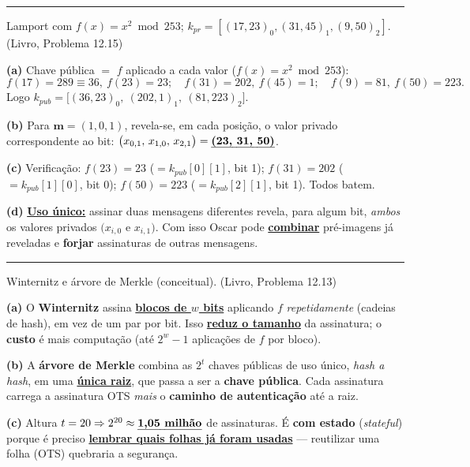 \documentclass[11pt,a4paper]{article}
\newcommand{\livro}[1]{{\footnotesize\color{black!50}(Livro, Problema #1)}}
\newcommand{\alert}[1]{\textbf{\uline{#1}}}
\newcommand{\exercicio}[1]{%
    \Needspace{8\baselineskip}%
    \par\vspace{1.2em}
    \noindent
    {\color{black!55}\rule[-0.25em]{3pt}{1.6em}}%
    \hspace{0.6em}{\Large\bfseries Exerc\'{i}cio #1}
    \par\vspace{-0.4em}
    \noindent{\color{black!35}\rule{\textwidth}{0.4pt}}
    \par\vspace{0.35em}
}
\newenvironment{resposta}{%
    \begin{respostabox}
    \color{red!70!black}\sloppy
}{%
    \end{respostabox}
}
\begin{document}
\exercicio{7}
Lamport com $f(x)=x^2\bmod 253$; $k_{pr}=[(17,23)_0,(31,45)_1,(9,50)_2]$. \livro{12.15}
\begin{resposta}
\textbf{(a)} Chave p\'{u}blica $=$ $f$ aplicado a cada valor ($f(x)=x^2\bmod 253$):
\[
f(17)=289\equiv 36,\ f(23)=23;\quad f(31)=202,\ f(45)=1;\quad f(9)=81,\ f(50)=223.
\]
Logo $k_{pub} = \big[(36,23)_0,\ (202,1)_1,\ (81,223)_2\big]$.

\textbf{(b)} Para $\mathbf{m}=(1,0,1)$, revela-se, em cada posi\c{c}\~{a}o, o valor privado correspondente ao bit: $\big(x_{0,1},\,x_{1,0},\,x_{2,1}\big) = \alert{(23,\ 31,\ 50)}$.

\textbf{(c)} Verifica\c{c}\~{a}o: $f(23)=23$ ($=k_{pub}[0][1]$, bit 1); $f(31)=202$ ($=k_{pub}[1][0]$, bit 0); $f(50)=223$ ($=k_{pub}[2][1]$, bit 1). Todos batem. \checkmark

\textbf{(d)} \alert{Uso \'{u}nico:} assinar duas mensagens diferentes revela, para algum bit, \emph{ambos} os valores privados $(x_{i,0}$ e $x_{i,1})$. Com isso Oscar pode \alert{combinar} pr\'{e}-imagens j\'{a} reveladas e \textbf{forjar} assinaturas de outras mensagens.
\end{resposta}

\exercicio{8}
Winternitz e \'{a}rvore de Merkle (conceitual). \livro{12.13}
\begin{resposta}
\textbf{(a)} O \textbf{Winternitz} assina \alert{blocos de $w$ bits} aplicando $f$ \emph{repetidamente} (cadeias de hash), em vez de um par por bit. Isso \alert{reduz o tamanho} da assinatura; o \textbf{custo} \'{e} mais computa\c{c}\~{a}o (at\'{e} $2^{w}-1$ aplica\c{c}\~{o}es de $f$ por bloco).

\textbf{(b)} A \textbf{\'{a}rvore de Merkle} combina as $2^{t}$ chaves p\'{u}blicas de uso \'{u}nico, \emph{hash a hash}, em uma \alert{\'{u}nica raiz}, que passa a ser a \textbf{chave p\'{u}blica}. Cada assinatura carrega a assinatura OTS \emph{mais} o \textbf{caminho de autentica\c{c}\~{a}o} at\'{e} a raiz.

\textbf{(c)} Altura $t=20 \Rightarrow 2^{20} \approx \alert{1{,}05\ \text{milh\~{a}o}}$ de assinaturas. \'{E} \textbf{com estado} (\textit{stateful}) porque \'{e} preciso \alert{lembrar quais folhas j\'{a} foram usadas} --- reutilizar uma folha (OTS) quebraria a seguran\c{c}a.
\end{resposta}
\end{document}

